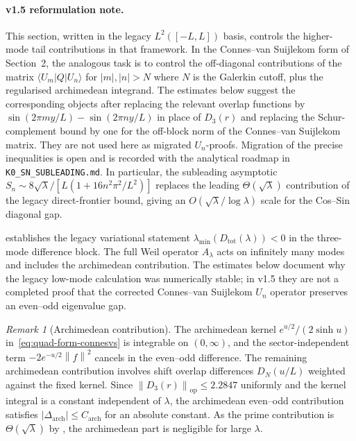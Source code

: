 \documentclass[11pt,a4paper]{article}
\theoremstyle{remark}
\newtheorem{remark}[remark]{Remark}
\theoremstyle{plain}
\newcommand{\norm}[1]{\left\lVert #1 \right\rVert}
\begin{document}
\paragraph{v1.5 reformulation note.}  This section, written in the
legacy $L^2([-L,L])$ basis, controls the higher-mode tail
contributions in that framework.  In the Connes--van Suijlekom form
of Section~2, the analogous task is to control the off-diagonal
contributions of the matrix $\langle U_m|Q|U_n\rangle$ for
$|m|,|n|>N$ where $N$ is the Galerkin cutoff, plus the regularised
archimedean integrand.  The estimates below suggest the corresponding
objects after replacing the relevant overlap functions by
$\sin(2\pi m y/L) - \sin(2\pi n y/L)$ in place of $D_3(r)$ and replacing the
Schur-complement bound by one for the off-block norm of the
Connes--van Suijlekom matrix.  They are not used here as migrated
$U_n$-proofs. Migration of the precise inequalities
is open and is recorded with the analytical roadmap in
\texttt{K0\_SN\_SUBLEADING.md}.  In particular, the subleading
asymptotic $S_n \sim 8\sqrt\lambda/[L(1+16n^2\pi^2/L^2)]$ replaces
the leading $\Theta(\sqrt\lambda)$ contribution of the legacy
direct-frontier bound, giving an $O(\sqrt\lambda/\log\lambda)$ scale
for the Cos--Sin diagonal gap.

\bigskip

 establishes the legacy variational statement
$\lambda_{\min}(D_{\mathrm{tot}}(\lambda))<0$ in the three-mode difference
block. The full Weil operator $A_\lambda$ acts on infinitely many modes and
includes the archimedean contribution. The estimates below document why the
legacy low-mode calculation was numerically stable; in v1.5 they are not a
completed proof that the corrected Connes--van Suijlekom $U_n$ operator
preserves an even--odd eigenvalue gap.

\begin{remark}[Archimedean contribution]
\label{rem:archimedean}
The archimedean kernel $e^{u/2}/(2\sinh u)$ in~\eqref{eq:quad-form-connesvs} is integrable
on $(0,\infty)$, and the sector-independent term $-2e^{-u/2}\norm{f}^2$ cancels in the
even--odd difference. The remaining archimedean contribution involves shift overlap
differences $D_N(u/L)$ weighted against the fixed kernel. Since
$\norm{D_3(r)}_{\mathrm{op}}\leq 2.2847$ uniformly and the kernel integral is a
constant independent of $\lambda$, the archimedean even--odd contribution satisfies
$|\Delta_{\mathrm{arch}}|\leq C_{\mathrm{arch}}$ for an absolute constant. As the
prime contribution is $\Theta(\sqrt\lambda)$ by , the archimedean
part is negligible for large $\lambda$.
\end{remark}
\end{document}
